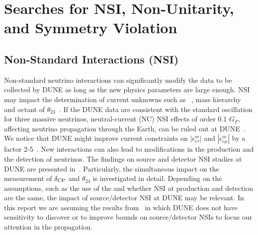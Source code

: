 
\section{Searches for NSI, Non-Unitarity, and  Symmetry Violation}
\subsection{Non-Standard Interactions (NSI)}
\label{sec:nsi}
Non-standard neutrino interactions can significantly modify the data to be collected by DUNE as long as the new physics parameters are large enough. NSI may impact the determination of current unknowns such as ~\cite{Masud:2015xva,Masud:2016bvp}, mass hierarchy~\cite{Masud:2016gcl} and octant of $\theta_{23}$~\cite{Agarwalla:2016fkh}. If the DUNE data are consistent with the standard oscillation for three massive neutrinos, neutral-current (NC) NSI effects of order 0.1 $G_F$, affecting neutrino propagation through the Earth, can be ruled out at DUNE~\cite{deGouvea:2015ndi,Coloma:2015kiu}. We notice that DUNE might improve current constraints on $|\epsilon^m_{e \tau}|$ and $|\epsilon^m_{e \mu}|$ by a factor 2-5~\cite{Ohlsson:2012kf,Miranda:2015dra,Farzan:2017xzy}. New    interactions can also lead to modifications in the production and the detection of neutrinos. The findings on source and detector NSI studies at DUNE are presented in~\cite{Blennow:2016etl,Bakhti:2016gic}. Particularly, the simultaneous impact on the measurement of $\delta_{\rm CP}$ and $\theta_{23}$ is investigated in detail. Depending on the assumptions, such as the use of the   and whether NSI at production and detection are the same, the impact of source/detector NSI at DUNE may be relevant. In this report we are assuming the results from~\cite{Blennow:2016etl} in which DUNE does not have sensitivity to discover or to improve bounds on source/detector NSIs to focus our attention in the propagation.

